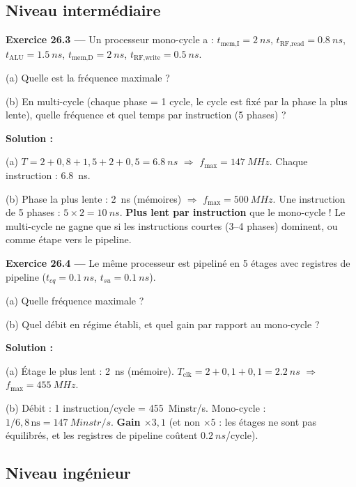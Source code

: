 \documentclass[12pt,a4paper,twoside]{book}
\begin{document}
\subsection*{Niveau intermédiaire}

\textbf{Exercice 26.3 ---} Un processeur mono-cycle a : $t_{\text{mem,I}} = \SI{2}{ns}$, $t_{\text{RF,read}} = \SI{0.8}{ns}$, $t_{\text{ALU}} = \SI{1.5}{ns}$, $t_{\text{mem,D}} = \SI{2}{ns}$, $t_{\text{RF,write}} = \SI{0.5}{ns}$.

(a) Quelle est la fréquence maximale ?

(b) En multi-cycle (chaque phase = 1 cycle, le cycle est fixé par la phase la plus lente), quelle fréquence et quel temps par instruction (5 phases) ?

\begin{pratique}
\textbf{Solution :}

(a) $T = 2+0{,}8+1{,}5+2+0{,}5 = \SI{6.8}{ns}$ $\Rightarrow$ $f_{\max} = \SI{147}{MHz}$. Chaque instruction : \SI{6.8}{ns}.

(b) Phase la plus lente : \SI{2}{ns} (mémoires) $\Rightarrow$ $f_{\max} = \SI{500}{MHz}$. Une instruction de 5 phases : $5\times2 = \SI{10}{ns}$. \textbf{Plus lent par instruction} que le mono-cycle ! Le multi-cycle ne gagne que si les instructions courtes (3--4 phases) dominent, ou comme étape vers le pipeline.
\end{pratique}

\textbf{Exercice 26.4 ---} Le même processeur est pipeliné en 5 étages avec registres de pipeline ($t_{cq} = \SI{0.1}{ns}$, $t_{su} = \SI{0.1}{ns}$).

(a) Quelle fréquence maximale ?

(b) Quel débit en régime établi, et quel gain par rapport au mono-cycle ?

\begin{pratique}
\textbf{Solution :}

(a) Étage le plus lent : \SI{2}{ns} (mémoire). $T_{\text{clk}} = 2 + 0{,}1 + 0{,}1 = \SI{2.2}{ns}$ $\Rightarrow$ $f_{\max} = \SI{455}{MHz}$.

(b) Débit : 1 instruction/cycle = \SI{455}{Minstr/s}. Mono-cycle : $1/6{,}8\,\text{ns} = \SI{147}{Minstr/s}$. \textbf{Gain $\times 3{,}1$} (et non $\times 5$ : les étages ne sont pas équilibrés, et les registres de pipeline coûtent $\SI{0.2}{ns}$/cycle).
\end{pratique}

\subsection*{Niveau ingénieur}
\end{document}
